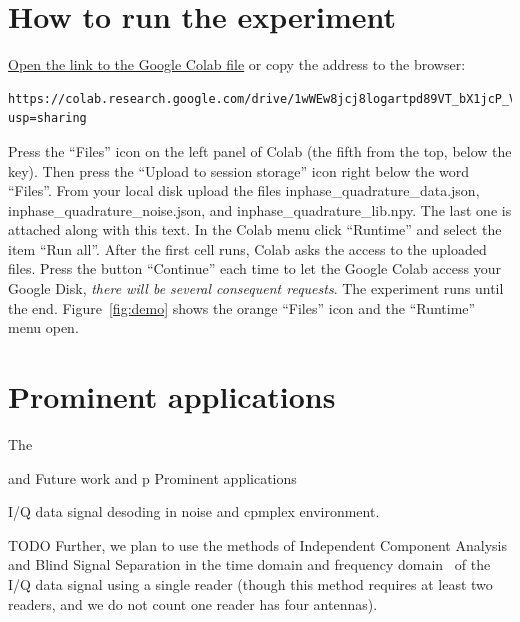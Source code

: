 \documentclass[12pt]{article}
\begin{document}
\section{How to run the experiment}\label{sec:experiment}
\href{https://colab.research.google.com/drive/1wWEw8jcj8logartpd89VT_bX1jcP_VBb?usp=sharing}{Open the link to the Google Colab file} or copy the address to the browser:
{\footnotesize
\begin{verbatim}https://colab.research.google.com/drive/1wWEw8jcj8logartpd89VT_bX1jcP_VBb?usp=sharing\end{verbatim}}
\noindent
Press the ``Files'' icon on the left panel of Colab (the fifth from the top, below the key). Then press the ``Upload to session storage'' icon right below the word ``Files''.  From your local disk upload the files \textsf{inphase\_quadrature\_data.json}, \textsf{inphase\_quadrature\_noise.json}, and \textsf{inphase\_quadrature\_lib.npy}. The last one is attached along with this text. In the Colab menu click ``Runtime'' and select the item ``Run all''. After the first cell runs, Colab asks the access to the uploaded files. Press the button ``Continue'' each time to let the Google Colab access your Google Disk, \emph{there will be several consequent requests}. The experiment runs until the end. Figure~\ref{fig:demo} shows the orange ``Files'' icon and the ``Runtime'' menu open.\sloppy{}




\section{Prominent applications}
The \cite{Katrutsa2017,Katrutsa2015}


and Future work and p
Prominent applications

I/Q data signal desoding in noise and cpmplex environment. 


TODO Further, we plan to use the methods of Independent Component Analysis and Blind Signal Separation in the time domain and frequency domain~\cite{Hyvaerinen2000,Elliott1999} of the I/Q data signal using a single reader (though this method requires at least two readers, and we do not count one reader has four antennas). 




\end{document}
